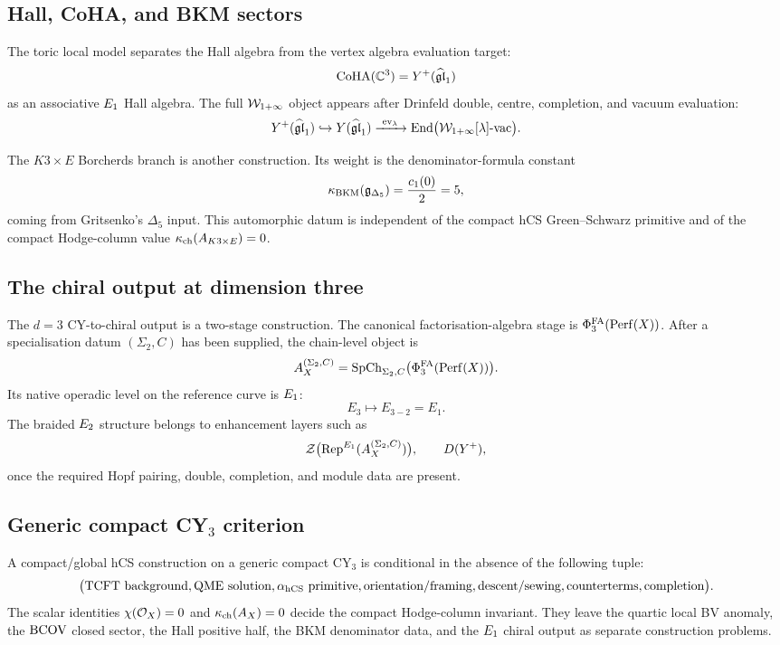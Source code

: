 \subsection{Hall, CoHA, and BKM sectors}

The toric local model separates the Hall algebra from the vertex
algebra evaluation target:
\[
  \mathrm{CoHA}(\mathbb{C}^3)=Y^+(\widehat{\mathfrak{gl}}_1)
\]
as an associative \(E_1\) Hall algebra.  The full
\(\mathcal{W}_{1+\infty}\) object appears after Drinfeld double, centre,
completion, and vacuum evaluation:
\[
  Y^+(\widehat{\mathfrak{gl}}_1)
  \hookrightarrow
  Y(\widehat{\mathfrak{gl}}_1)
  \xrightarrow{\ \mathrm{ev}_{\lambda}\ }
  \mathrm{End}\bigl(\mathcal{W}_{1+\infty}[\lambda]\text{-}\mathrm{vac}\bigr).
\]

The \(K3\times E\) Borcherds branch is another construction.  Its
weight is the denominator-formula constant
\[
  \kappa_{\mathrm{BKM}}(\mathfrak g_{\Delta_5})=\frac{c_1(0)}{2}=5,
\]
coming from Gritsenko's \(\Delta_5\) input.  This automorphic datum is
independent of the compact hCS Green--Schwarz primitive and of the
compact Hodge-column value \(\kappa_{\mathrm{ch}}(A_{K3\times E})=0\).

\subsection{The chiral output at dimension three}

The \(d=3\) CY-to-chiral output is a two-stage construction.  The
canonical factorisation-algebra stage is \(\Phi^{\mathrm{FA}}_3(\mathrm{Perf}(X))\).
After a specialisation datum \((\Sigma_2,C)\) has been supplied, the
chain-level object is
\[
  A_X^{(\Sigma_2,C)}
  =
  \mathrm{SpCh}_{\Sigma_2,C}\bigl(\Phi^{\mathrm{FA}}_3(\mathrm{Perf}(X))\bigr).
\]
Its native operadic level on the reference curve is \(E_1\):
\[
  E_3 \longmapsto E_{3-2}=E_1.
\]
The braided \(E_2\) structure belongs to enhancement layers such as
\[
  \mathcal{Z}\bigl(\mathrm{Rep}^{E_1}(A_X^{(\Sigma_2,C)})\bigr),
  \qquad
  D(Y^+),
\]
once the required Hopf pairing, double, completion, and module data are
present.

\subsection{Generic compact CY$_3$ criterion}

A compact/global hCS construction on a generic compact CY$_3$ is
conditional in the absence of the following tuple:
\[
  \bigl(
  \mathrm{TCFT}\text{ background},
  \mathrm{QME}\text{ solution},
  \alpha_{\mathrm{hCS}}\text{ primitive},
  \text{orientation/framing},
  \text{descent/sewing},
  \text{counterterms},
  \text{completion}
  \bigr).
\]
The scalar identities \(\chi(\mathcal{O}_X)=0\) and \(\kappa_{\mathrm{ch}}(A_X)=0\) decide the
compact Hodge-column invariant.  They leave the quartic local BV
anomaly, the \(\mathrm{BCOV}\) closed sector, the Hall positive half, the BKM
denominator data, and the \(E_1\) chiral output as separate
construction problems.

